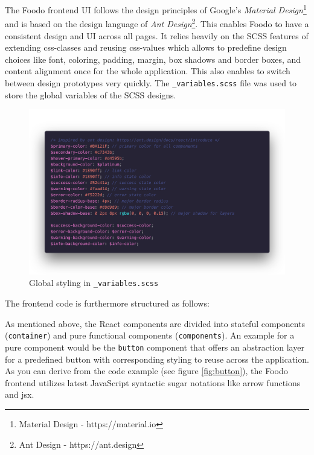 The Foodo frontend UI follows the design principles of Google’s \textit{Material Design}\footnote{Material Design - https://material.io} and is based on the design language of \textit{Ant Design}\footnote{Ant Design - https://ant.design}. This enables Foodo to have a consistent design and UI across all pages. It relies heavily on the SCSS features of extending css-classes and reusing css-values which allows to predefine design choices like font, coloring, padding, margin, box shadows and border boxes, and content alignment once for the whole application. This also enables to switch between design prototypes very quickly. The \texttt{\_variables.scss} file was used to store the global variables of the SCSS designs. 
\vspace{-2em}
\begin{figure}[ht]
	\captionsetup{justification=centering}
	\begin{center}
		\includegraphics[scale=0.25]{Ressourcen/img/code/scss.png}
		\vspace{-3em}
		\caption{Global styling in \texttt{\_variables.scss}}
	\end{center}
\end{figure}


The frontend code is furthermore structured as follows:


As mentioned above, the React components are divided into stateful components (\texttt{container}) and pure functional components (\texttt{components}). An example for a pure component would be the \texttt{button} component that offers an abstraction layer for a predefined button with corresponding styling to reuse across the application. As you can derive from the code example (see figure \ref{fig:button}), the Foodo frontend utilizes latest JavaScript syntactic sugar notations like arrow functions and \gls{jsx}.

